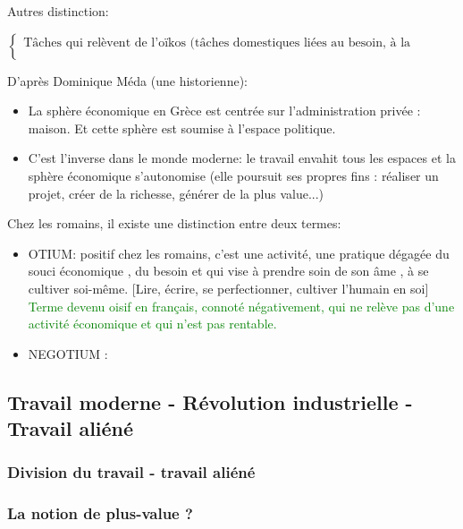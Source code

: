 \documentclass[a4paper, 11pt, hidelinks]{article}
\newcommand{\bs}{\bigskip}
\begin{document}
Autres distinction:

$\begin{cases}
    \text{Tâches qui relèvent de l'oïkos (tâches domestiques liées au besoin, à la nécessité) (travail inférieur : esclaves)} \\
    
\end{cases}$


D'après Dominique Méda (une historienne):


\begin{itemize}
    \item La sphère \og économique \fg en Grèce est centrée sur l'administration \og privée \fg: maison. Et cette sphère est soumise à 
    l'espace politique.
    \item C'est l'inverse dans le monde moderne: le travail \og envahit \fg tous les espaces et la sphère économique s'autonomise
    (elle poursuit ses propres fins : réaliser un projet, créer de la richesse, générer de la plus value...)
\end{itemize}

\bs

Chez les romains, il existe une distinction entre deux termes:

\begin{itemize}
    \item OTIUM: positif chez les romains, c'est une activité, une pratique dégagée du \og souci économique \fg, du besoin et qui vise à
    \og prendre soin de son âme \fg, à se cultiver soi-même. [Lire, écrire, se perfectionner, cultiver l'humain en soi] \textcolor{green}{
        Terme devenu \og oisif \fg en français, connoté négativement, qui ne relève pas d'une activité économique et qui n'est pas rentable.}
    \item NEGOTIUM :
\end{itemize}



\subsection{Travail moderne - Révolution industrielle - Travail aliéné}

\subsubsection{Division du travail - travail aliéné}


\subsubsection{La notion de plus-value ?}
\end{document}
